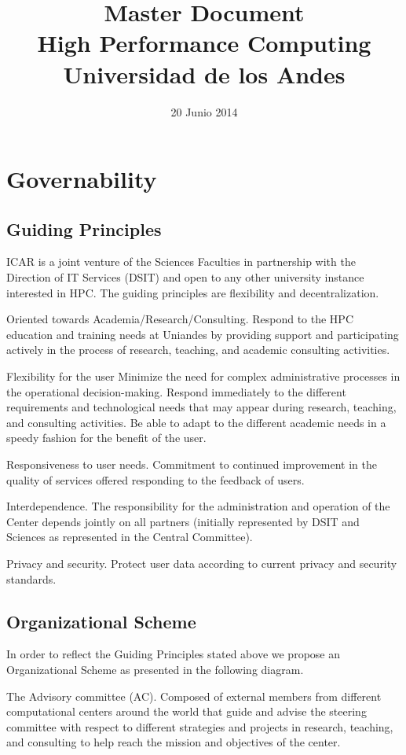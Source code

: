 \documentclass{article}
\title{Master Document\\
High Performance Computing\\
Universidad de los Andes}
\date{20 Junio 2014}
\begin{document}
\maketitle

\section{Governability}

\subsection{Guiding Principles}

ICAR is a joint venture of the Sciences Faculties in partnership with the Direction of IT Services (DSIT) and open to any other university instance interested in HPC. The guiding principles are flexibility and decentralization.

Oriented towards Academia/Research/Consulting. Respond to the HPC education and training needs at Uniandes by providing support and participating actively in the process of research, teaching, and academic consulting activities.

Flexibility for the user Minimize the need for complex administrative processes in the operational decision-making. Respond immediately to the different requirements and technological needs that may appear during research, teaching, and consulting activities. Be able to adapt to the different academic needs in a speedy fashion for the benefit of the user.

Responsiveness to user needs. Commitment to continued improvement in the quality of services offered responding to the feedback of users.

Interdependence. The responsibility for the administration and operation of the Center depends jointly on all partners (initially represented by DSIT and Sciences as represented in the Central Committee).

Privacy and security. Protect user data according to current privacy and security standards.

\subsection{Organizational Scheme}

In order to reflect the Guiding Principles stated above we propose an Organizational Scheme as presented in the following diagram.

The Advisory committee (AC). Composed of external members from different computational centers around the world that guide and advise the steering committee with respect to different strategies and projects in research, teaching, and consulting to help reach the mission and objectives of the center.
\end{document}
